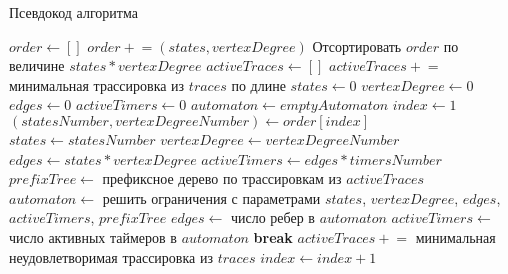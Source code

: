 \documentclass[times,specification,annotation]{itmo-student-thesis}
\begin{document}
\begin{algorithm}[!h]
\caption{Псевдокод алгоритма}\label{lst1}
\begin{algorithmic}[1]
		\State $order \gets []$
		 \label{lst:line:start1}
				\State $order \mathrel{+}= \left(states, vertexDegree\right)$
			\EndFor
		\EndFor	\label{lst:line:end1}
		\State Отсортировать $order$ по величине $states * vertexDegree$
		\State $activeTraces \gets []$ \label{lst:line:activeTraces}
		\State $activeTraces \mathrel{+}=$ минимальная трассировка из $traces$ по длине
		\State $states \gets 0$
		\State $vertexDegree \gets 0$
		\State $edges \gets 0$
		\State $activeTimers \gets 0$
		\State $automaton \gets emptyAutomaton$
		\State $index \gets 1$
		\Loop \label{lst:line:start2}
			\State $\left(statesNumber, vertexDegreeNumber\right) \gets order[index]$
			\State $states \gets statesNumber$
			\State $vertexDegree \gets vertexDegreeNumber$
			\State $edges \gets states * vertexDegree$
			\State $activeTimers \gets edges * timersNumber$
			\State $prefixTree \gets$ префиксное дерево по трассировкам из $activeTraces$
			\State $automaton \gets$ решить ограничения с параметрами $states$, $vertexDegree$, $edges$, $activeTimers$, $prefixTree$
					\State $edges \gets$ число ребер в $automaton$
					\State $activeTimers \gets$ число активных таймеров в $automaton$
					\State \textbf{break}
				\Else
					\State $activeTraces \mathrel{+}=$ минимальная неудовлетворимая трассировка из $traces$
				\EndIf
			\Else
				\State $index \gets index + 1$
			\EndIf
		\EndLoop \label{lst:line:end2}
\end{algorithmic}
\end{algorithm}
\end{document}

